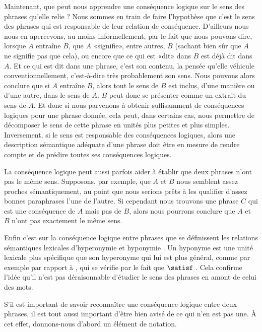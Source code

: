 \begin{refsegment}
Maintenant, que peut nous apprendre une conséquence logique sur le sens
des phrases qu'elle relie ?  
Nous sommes en train de faire l'hypothèse que
c'est le sens des phrases
qui est responsable de leur relation de conséquence.  
D'ailleurs nous nous en apercevons,
au moins informellement, par le fait que nous pouvons dire, lorsque $A$
entraîne $B$,
que $A$  «signifie», entre
autres, $B$ (sachant bien sûr que $A$ ne signifie pas que
cela), ou encore que ce qui est «dit» dans  $B$ est déjà dit
dans  $A$.  Et ce qui est dit dans une phrase, c'est son
contenu, la pensée qu'elle véhicule conventionnellement, c'est-à-dire
très probablement son sens.  Nous pouvons alors conclure que si $A$
entraîne $B$, alors tout le sens de $B$ est inclus, d'une manière ou d'une autre, dans le sens de
$A$.
%
%
$B$ peut donc se présenter comme un extrait du sens de $A$.  Et
donc si nous parvenons à obtenir suffisamment de 
conséquences logiques 
pour une phrase donnée, cela peut, dans certains cas, nous permettre
de décomposer le sens 
de cette phrase en unités plus petites et plus simples.
Inversement, si le sens est responsable des conséquences logiques, alors une description sémantique adéquate d'une phrase doit être en mesure de rendre compte et de prédire toutes ses conséquences logiques.

La conséquence logique peut aussi parfois aider à établir que deux phrases n'ont pas le même sens. Supposons, par exemple, que $A$ et $B$ nous semblent assez proches sémantiquement, au point que nous serions prêts à les qualifier d'assez bonnes paraphrases l'une de l'autre.  Si cependant nous trouvons une phrase $C$ qui est une conséquence de $A$ mais pas de $B$, alors nous pourrons conclure que $A$ et $B$ n'ont pas exactement le même sens.

Enfin c'est sur la conséquence logique entre phrases que se définissent les relations sémantiques lexicales d'hyperonymie et hyponymie \citep[cf.][p.~89]{Cruse:86}. Un hyponyme est une unité lexicale plus spécifique que son hyperonyme qui lui est plus général, comme par exemple  par rapport à , qui se vérifie par le fait que  $\satisf$ .  Cela confirme l'idée qu'il n'est pas déraisonnable d'étudier le sens des phrases en amont de celui des mots. 



\medskip %

S'il est important de savoir reconnaître une conséquence logique
entre deux phrases, il est tout aussi important d'être bien avisé de ce qui
n'en est pas une.  À cet effet, donnons-nous d'abord
un élément de notation.  


\end{refsegment}
